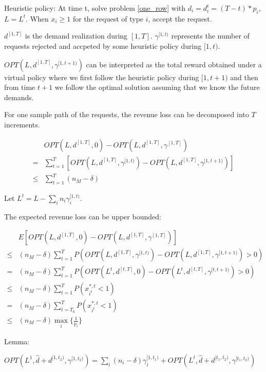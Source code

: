 Heuristic policy: At time t, solve problem \eqref{one_row} with $d_{i} = d_{i}^{t} = (T-t) * p_{i}$, $L = L^{t}$. When $x_{i}\geq 1$ for the request of type $i$, accept the request.



$d^{[1, T]}$ is the demand realization during $[1, T]$. $\gamma^{[1, t)}$ represents the number of requests rejected and accpeted by some heuristic policy during $[1, t)$. 

$OPT(L, d^{[1, T]}, \gamma^{[1,t+1)})$ can be interpreted as the total reward obtained under a virtual policy where we first follow the heuristic policy during $[1, t+1)$ and then from time $t+1$ we follow the optimal solution assuming that we know the future demands.

For one sample path of the requests, the revenue loss can be decomposed into $T$ increments.

\begin{align*}
    & OPT(L, d^{[1, T]}, 0) - OPT(L, d^{[1, T]}, \gamma^{[1, T]}) \\
 = & \sum_{t=1}^{T} [OPT(L, d^{[1,T]}, \gamma^{[1,t)}) - OPT(L, d^{[1,T]}, \gamma^{[1,t+1)})] \\
 \leq & \sum_{t=1}^{T} (n_{M} - \delta)
\end{align*}

Let $L^{t} = L-\sum_{i}n_{i} \gamma_{i}^{[1,t)}$.

The expected revenue loss can be upper bounded:

\begin{align*}
    & E[OPT(L, d^{[1, T]}, 0) - OPT(L, d^{[1, T]}, \gamma^{[1, T]})] \\
 \leq & (n_{M} - \delta) \sum_{t=1}^{T} P(OPT(L, d^{[1, T]}, \gamma^{[1,t)}) - OPT(L, d^{[1, T]}, \gamma^{[1,t+1)}) > 0) \\
 = & (n_{M} - \delta) \sum_{t=1}^{T} P(OPT(L^{t}, d^{[t, T]}, 0) - OPT(L^{t}, d^{[t, T]}, \gamma^{[t,t+1)}) > 0) \\
 \leq & (n_{M} - \delta) \sum_{t=1}^{T} P(x_{i^{t}}^{*,t} <1) \\
 = & (n_{M} - \delta) \sum_{t=T_{0}}^{T} P(x_{i^{t}}^{*,t} <1) \\
 \leq & (n_{M} - \delta) \max_{i}\{\frac{1}{p_{i}}\} 
\end{align*}


Lemma:

$OPT(L^{1}, \hat{d} + d^{[1, t_2)} , \gamma^{[1, t_2)}) = \sum_{i} (n_{i} - \delta) \gamma_{i}^{[1, t_1)} + OPT(L^{t}, \hat{d}+d^{[t_1, t_2)}, \gamma^{[t_1, t_2)})$

